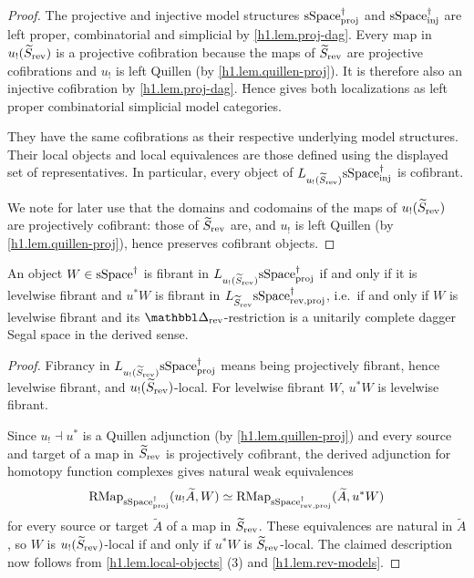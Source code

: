 \documentclass[a4paper,dvipdfmx,11pt]{amsart}
\begin{document}
\begin{proof}
  The projective and injective model structures $\mathrm{sSpace}^{\dag}_{\mathrm{proj}}$ and $\mathrm{sSpace}^{\dag}_{\mathrm{inj}}$ are left proper, combinatorial and simplicial by \cref{h1.lem.proj-dag}.
  Every map in $u_{!}(\widetilde S_{\mathrm{rev}})$ is a projective cofibration because the maps of $\widetilde S_{\mathrm{rev}}$ are projective cofibrations and $u_{!}$ is left Quillen (by \cref{h1.lem.quillen-proj}).
  It is therefore also an injective cofibration by \cref{h1.lem.proj-dag}.
  Hence \cite[Proposition~A.3.7.3]{HTT} gives both localizations as left proper combinatorial simplicial model categories.

  They have the same cofibrations as their respective underlying model structures.
  Their local objects and local equivalences are those defined using the displayed set of representatives.
  In particular, every object of $L_{u_{!}(\widetilde S_{\mathrm{rev}})}\mathrm{sSpace}^{\dag}_{\mathrm{inj}}$ is cofibrant.

  We note for later use that the domains and codomains of the maps of $u_{!}(\widetilde S_{\mathrm{rev}})$ are projectively cofibrant: those of $\widetilde S_{\mathrm{rev}}$ are, and $u_{!}$ is left Quillen (by \cref{h1.lem.quillen-proj}), hence preserves cofibrant objects.
\end{proof}

\begin{proposition}\label{h1.prop.fibrant}
  An object $W\in\mathrm{sSpace}^{\dag}$ is fibrant in $L_{u_{!}(\widetilde S_{\mathrm{rev}})}\mathrm{sSpace}^{\dag}_{\mathrm{proj}}$ if and only if it is levelwise fibrant and $u^{*}W$ is fibrant in $L_{\widetilde S_{\mathrm{rev}}}\mathrm{sSpace}^{\dag}_{\mathrm{rev},\mathrm{proj}}$, 
  i.e.\ if and only if $W$ is levelwise fibrant and its $\prism_{\rev}$-restriction is a unitarily complete dagger Segal space in the derived sense. 
\end{proposition}

\begin{proof}
  Fibrancy in $L_{u_{!}(\widetilde S_{\mathrm{rev}})}\mathrm{sSpace}^{\dag}_{\mathrm{proj}}$ means being projectively fibrant, hence levelwise fibrant, and $u_{!}(\widetilde S_{\mathrm{rev}})$-local.
  For levelwise fibrant $W$, $u^{*}W$ is levelwise fibrant.
  
  Since $u_{!}\dashv u^{*}$ is a Quillen adjunction (by \cref{h1.lem.quillen-proj}) and every source and target of a map in $\widetilde S_{\mathrm{rev}}$ is projectively cofibrant, the derived adjunction for homotopy function complexes \cite[Proposition~17.4.16]{Hir02} gives natural weak equivalences
  \begin{align}
    \mathrm{RMap}_{\mathrm{sSpace}^{\dag}_{\mathrm{proj}}}(u_{!}\widetilde A,W)
    \simeq
    \mathrm{RMap}_{\mathrm{sSpace}^{\dag}_{\mathrm{rev},\mathrm{proj}}}(\widetilde A,u^{*}W)
  \end{align}
  for every source or target $\widetilde A$ of a map in $\widetilde S_{\mathrm{rev}}$.
  These equivalences are natural in $\widetilde A$, so $W$ is $u_{!}(\widetilde S_{\mathrm{rev}})$-local if and only if $u^{*}W$ is $\widetilde S_{\mathrm{rev}}$-local.
  The claimed description now follows from \cref{h1.lem.local-objects} (3) and \cref{h1.lem.rev-models}.
\end{proof}
\end{document}
